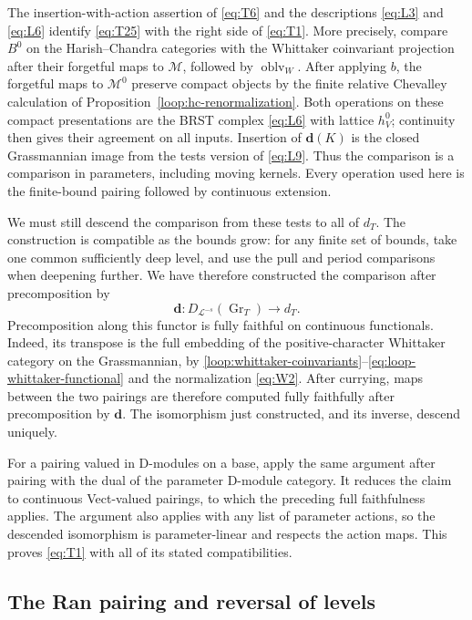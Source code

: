 \documentclass[11pt]{article}
\numberwithin{equation}{section}
\theoremstyle{definition}
\theoremstyle{remark}
\begin{document}
The insertion-with-action assertion of \eqref{eq:T6} and the descriptions
\eqref{eq:L3} and \eqref{eq:L6} identify \eqref{eq:T25} with the right
side of \eqref{eq:T1}.  More precisely, compare $B^0$ on the
Harish--Chandra categories with the Whittaker coinvariant projection
after their forgetful maps to $\mathcal M$, followed by
$\operatorname{oblv}_W$.  After applying
$b$, the forgetful maps to $\mathcal M^0$ preserve compact objects by
the finite relative Chevalley calculation of
Proposition~\ref{loop:hc-renormalization}.  Both operations on these
compact presentations are the BRST complex \eqref{eq:L6} with lattice
$h_V^0$; continuity then gives their agreement on all inputs.  Insertion
of $\mathbf d(K)$ is the closed Grassmannian image from the tests version
of \eqref{eq:L9}.  Thus the comparison is a comparison in parameters,
including moving kernels.  Every operation used here is the finite-bound
pairing followed by continuous extension.

We must still descend the comparison from these tests to all of $d_T$.
The construction is compatible as the bounds grow: for any finite set of
bounds, take one common sufficiently deep level, and use the pull and
period comparisons when deepening further.  We have therefore constructed
the comparison after precomposition by
\[
 \mathbf d:D_{\mathcal L^{-s}}(\operatorname{Gr}_T)\longrightarrow d_T.
\]
Precomposition along this functor is fully faithful on continuous
functionals.  Indeed, its transpose is the full embedding of the
positive-character Whittaker category on the Grassmannian, by
\eqref{loop:whittaker-coinvariants}--\eqref{eq:loop-whittaker-functional}
and the normalization
\eqref{eq:W2}.  After currying, maps between the two pairings are therefore
computed fully faithfully after precomposition by $\mathbf d$.
The isomorphism just constructed, and its inverse, descend uniquely.

For a pairing valued in D-modules on a base, apply the same argument after
pairing with the dual of the parameter D-module category.  It reduces the
claim to continuous Vect-valued pairings, to which the preceding full
faithfulness applies.  The argument also applies with any list of
parameter actions, so the descended isomorphism is parameter-linear and
respects the action maps.  This proves \eqref{eq:T1} with all of its
stated compatibilities.

\subsection{The Ran pairing and reversal of levels}
\end{document}
